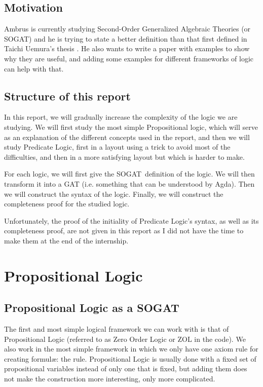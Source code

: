 \documentclass[10pt,a4paper]{article}
\begin{document}
		\subsection{Motivation}
			Ambrus is currently studying Second-Order Generalized Algebraic Theories (or SOGAT) and he is trying to state a better definition than that first defined in Taichi Uemura's thesis \cite{UemuraThesis2021}. He also wants to write a paper with examples to show why they are useful, and adding some examples for different frameworks of logic can help with that.
			
		\subsection{Structure of this report}
		
			In this report, we will gradually increase the complexity of the logic we are studying. We will first study the most simple Propositional logic, which will serve as an explanation of the different concepts used in the report, and then we will study Predicate Logic, first in a layout using a trick to avoid most of the difficulties, and then in a more satisfying layout but which is harder to make.
			
			For each logic, we will first give the SOGAT definition of the logic. We will then transform it into a GAT (i.e. something that can be understood by Agda). Then we will construct the syntax of the logic. Finally, we will construct the completeness proof for the studied logic.
			
			Unfortunately, the proof of the initiality of Predicate Logic's syntax, as well as its completeness proof, are not given in this report as I did not have the time to make them at the end of the internship.
			
	\section{Propositional Logic}
		\subsection{Propositional Logic as a SOGAT}
		
			The first and most simple logical framework we can work with is that of Propositional Logic (referred to as Zero Order Logic or ZOL in the code). We also work in the most simple framework in which we only have one axiom rule for creating formulæ: the \iotAgda{} rule. Propositional Logic is usually done with a fixed set of propositional variables instead of only one that is fixed, but adding them does not make the construction more interesting, only more complicated.
			
\end{document}
